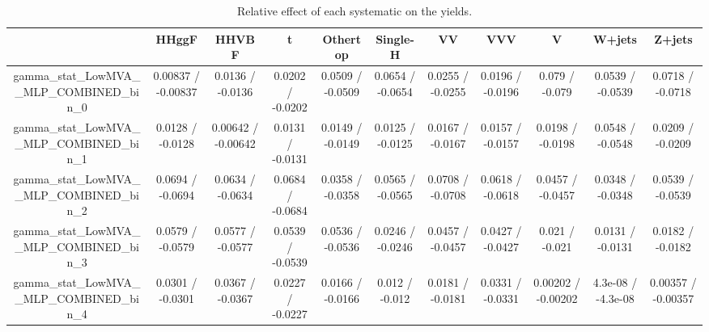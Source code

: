 \documentclass[10pt]{article}
\begin{document}
\begin{table}[htbp]
\begin{center}
\begin{tabular}{|c|c|c|c|c|c|c|c|c|c|c|}
\hline 
      & HHggF      & HHVBF      & t      & Othertop      & Single-H      & VV      & VVV      & V      & W+jets      & Z+jets \\ 
\hline 
  gamma_stat_LowMVA__MLP_COMBINED_bin_0 & 0.00837 / -0.00837 & 0.0136 / -0.0136 & 0.0202 / -0.0202 & 0.0509 / -0.0509 & 0.0654 / -0.0654 & 0.0255 / -0.0255 & 0.0196 / -0.0196 & 0.079 / -0.079 & 0.0539 / -0.0539 & 0.0718 / -0.0718 \\ 
  gamma_stat_LowMVA__MLP_COMBINED_bin_1 & 0.0128 / -0.0128 & 0.00642 / -0.00642 & 0.0131 / -0.0131 & 0.0149 / -0.0149 & 0.0125 / -0.0125 & 0.0167 / -0.0167 & 0.0157 / -0.0157 & 0.0198 / -0.0198 & 0.0548 / -0.0548 & 0.0209 / -0.0209 \\ 
  gamma_stat_LowMVA__MLP_COMBINED_bin_2 & 0.0694 / -0.0694 & 0.0634 / -0.0634 & 0.0684 / -0.0684 & 0.0358 / -0.0358 & 0.0565 / -0.0565 & 0.0708 / -0.0708 & 0.0618 / -0.0618 & 0.0457 / -0.0457 & 0.0348 / -0.0348 & 0.0539 / -0.0539 \\ 
  gamma_stat_LowMVA__MLP_COMBINED_bin_3 & 0.0579 / -0.0579 & 0.0577 / -0.0577 & 0.0539 / -0.0539 & 0.0536 / -0.0536 & 0.0246 / -0.0246 & 0.0457 / -0.0457 & 0.0427 / -0.0427 & 0.021 / -0.021 & 0.0131 / -0.0131 & 0.0182 / -0.0182 \\ 
  gamma_stat_LowMVA__MLP_COMBINED_bin_4 & 0.0301 / -0.0301 & 0.0367 / -0.0367 & 0.0227 / -0.0227 & 0.0166 / -0.0166 & 0.012 / -0.012 & 0.0181 / -0.0181 & 0.0331 / -0.0331 & 0.00202 / -0.00202 & 4.3e-08 / -4.3e-08 & 0.00357 / -0.00357 \\ 
\hline 
\end{tabular} 
\caption{Relative effect of each systematic on the yields.} 
\end{center} 
\end{table} 
\end{document}
